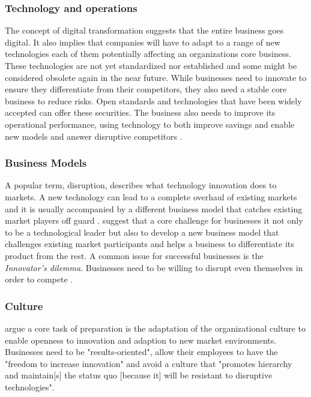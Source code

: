 \subsubsection{Technology and operations}
The concept of digital transformation suggests that the entire business goes digital. It also implies that companies will have to adapt to a range of new technologies %
 each of them potentially affecting an organizations core business. These technologies are not yet standardized nor established and some might be considered obsolete again in the near future. While businesses need to innovate to ensure they differentiate from their competitors, %
 they also need a stable core business to reduce risks. Open standards and technologies that have been widely accepted can offer these securities.
The business also needs to improve its operational performance, using technology to both improve savings and enable new models and answer disruptive competitors \cite[p.15ff.]{worldforumdigitalenterprise:2016}.


\subsubsection{Business Models}
A popular term, disruption, describes what technology innovation does to markets. A new technology can lead to a complete overhaul of existing markets and it is usually accompanied by a different business model that catches existing market players off guard \cite{LucasJr200946}. \citeauthor{gassmann2013geschaeftsmodelle} suggest that a core challenge for businesses it not only to be a technological leader but also to develop a new business model that challenges existing market participants and helps a business to differentiate its product from the rest. A common issue for successful businesses is the \emph{Innovator's dilemma}. Businesses need to be willing to disrupt even themselves in order to compete \cite{christensen1997innovator, worldforumdigitalenterprise:2016}.

\subsubsection{Culture}
\citeauthor{hammer:2015, LucasJr200946} argue a core task of preparation is the adaptation of the organizational culture to enable openness to innovation and adaption to new market environments. Businesses need to be "results-oriented", allow their employees to have the "freedom to increase innovation"\cite{hammer:2015} and avoid a culture that "promotes hierarchy and maintain[s] the status quo [because it] will be resistant to disruptive technologies"\cite{LucasJr200946}.
